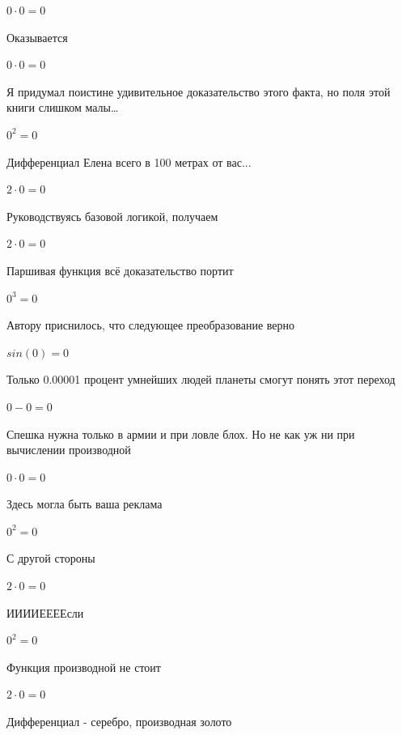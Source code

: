 \documentclass[12pt,a4paper,fleqn]{article}
\begin{document}
\begin{center}$0 \cdot 0 = 0$\end{center}
Оказывается

\begin{center}$0 \cdot 0 = 0$\end{center}
Я придумал поистине удивительное доказательство этого факта, но поля этой книги слишком малы\ldots

\begin{center}$0^{2} = 0$\end{center}
Дифференциал Елена всего в 100 метрах от вас...

\begin{center}$2 \cdot 0 = 0$\end{center}
Руководствуясь базовой логикой, получаем

\begin{center}$2 \cdot 0 = 0$\end{center}
Паршивая функция всё доказательство портит\cite{link2}

\begin{center}$0^{3} = 0$\end{center}
Автору приснилось, что следующее преобразование верно

\begin{center}$sin(0) = 0$\end{center}
Только 0.00001 процент умнейших людей планеты смогут понять этот переход

\begin{center}$0-0 = 0$\end{center}
Спешка нужна только в армии и при ловле блох. Но не как уж ни при вычислении производной\cite{link2}

\begin{center}$0 \cdot 0 = 0$\end{center}
Здесь могла быть ваша реклама

\begin{center}$0^{2} = 0$\end{center}
С другой стороны

\begin{center}$2 \cdot 0 = 0$\end{center}
ИИИИЕЕЕЕсли\cite{link3}

\begin{center}$0^{2} = 0$\end{center}
Функция производной не стоит\cite{link2}

\begin{center}$2 \cdot 0 = 0$\end{center}
Дифференциал - серебро, производная золото\cite{link2}
\end{document}

